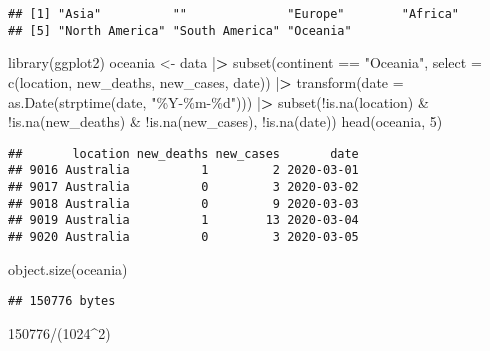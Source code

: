 \documentclass[
]{article}
\newenvironment{Shaded}{\begin{snugshade}}{\end{snugshade}}
\newcommand{\AttributeTok}[1]{\textcolor[rgb]{0.77,0.63,0.00}{#1}}
\newcommand{\DecValTok}[1]{\textcolor[rgb]{0.00,0.00,0.81}{#1}}
\newcommand{\ErrorTok}[1]{\textcolor[rgb]{0.64,0.00,0.00}{\textbf{#1}}}
\newcommand{\FunctionTok}[1]{\textcolor[rgb]{0.00,0.00,0.00}{#1}}
\newcommand{\NormalTok}[1]{#1}
\newcommand{\OtherTok}[1]{\textcolor[rgb]{0.56,0.35,0.01}{#1}}
\newcommand{\SpecialCharTok}[1]{\textcolor[rgb]{0.00,0.00,0.00}{#1}}
\newcommand{\StringTok}[1]{\textcolor[rgb]{0.31,0.60,0.02}{#1}}
\begin{document}
\begin{verbatim}
## [1] "Asia"          ""              "Europe"        "Africa"       
## [5] "North America" "South America" "Oceania"
\end{verbatim}

\begin{Shaded}
\begin{Highlighting}[]
\FunctionTok{library}\NormalTok{(ggplot2)}
\NormalTok{oceania }\OtherTok{\textless{}{-}}\NormalTok{ data }\SpecialCharTok{|}\ErrorTok{\textgreater{}} 
    \FunctionTok{subset}\NormalTok{(continent }\SpecialCharTok{==} \StringTok{"Oceania"}\NormalTok{, }\AttributeTok{select =} \FunctionTok{c}\NormalTok{(location, new\_deaths, new\_cases, date)) }\SpecialCharTok{|}\ErrorTok{\textgreater{}} 
    \FunctionTok{transform}\NormalTok{(}\AttributeTok{date =} \FunctionTok{as.Date}\NormalTok{(}\FunctionTok{strptime}\NormalTok{(date, }\StringTok{"\%Y{-}\%m{-}\%d"}\NormalTok{))) }\SpecialCharTok{|}\ErrorTok{\textgreater{}} 
    \FunctionTok{subset}\NormalTok{(}\SpecialCharTok{!}\FunctionTok{is.na}\NormalTok{(location) }\SpecialCharTok{\&} \SpecialCharTok{!}\FunctionTok{is.na}\NormalTok{(new\_deaths) }\SpecialCharTok{\&} \SpecialCharTok{!}\FunctionTok{is.na}\NormalTok{(new\_cases), }\SpecialCharTok{!}\FunctionTok{is.na}\NormalTok{(date))}
\FunctionTok{head}\NormalTok{(oceania, }\DecValTok{5}\NormalTok{)}
\end{Highlighting}
\end{Shaded}

\begin{verbatim}
##       location new_deaths new_cases       date
## 9016 Australia          1         2 2020-03-01
## 9017 Australia          0         3 2020-03-02
## 9018 Australia          0         9 2020-03-03
## 9019 Australia          1        13 2020-03-04
## 9020 Australia          0         3 2020-03-05
\end{verbatim}

\begin{Shaded}
\begin{Highlighting}[]
\FunctionTok{object.size}\NormalTok{(oceania)}
\end{Highlighting}
\end{Shaded}

\begin{verbatim}
## 150776 bytes
\end{verbatim}

\begin{Shaded}
\begin{Highlighting}[]
\DecValTok{150776}\SpecialCharTok{/}\NormalTok{(}\DecValTok{1024}\SpecialCharTok{\^{}}\DecValTok{2}\NormalTok{)}
\end{Highlighting}
\end{Shaded}
\end{document}
